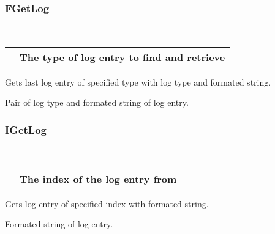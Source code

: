 \documentclass[letterpaper,10pt,english]{sphinxmanual}
\begin{document}
\subsubsection{FGetLog}
\label{\detokenize{log:fgetlog}}

\begin{fulllineitems}
\label{\detokenize{log:_CPPv2N6pessum7FGetLogEi}}%
\pysigstartmultiline
{}%
\pysigstopmultiline~

\begin{savenotes}\sphinxattablestart
\centering
\begin{tabulary}{\linewidth}[t]{|T|T|}
\hline

&
The type of log entry to find and retrieve
\\
\hline
\end{tabulary}
\par
\sphinxattableend\end{savenotes}

Gets last log entry of specified type with log type and formated string.

 Pair of log type and formated string of log entry.

\end{fulllineitems}



\subsubsection{IGetLog}
\label{\detokenize{log:igetlog}}

\begin{fulllineitems}
\label{\detokenize{log:_CPPv2N6pessum7IGetLogEi}}%
\pysigstartmultiline
{}%
\pysigstopmultiline~

\begin{savenotes}\sphinxattablestart
\centering
\begin{tabulary}{\linewidth}[t]{|T|T|}
\hline

&
The index of the log entry from {\hyperref[\detokenize{log:_CPPv2N6pessum11global_logsE}]{}}
\\
\hline
\end{tabulary}
\par
\sphinxattableend\end{savenotes}

Gets log entry of specified index with formated string.

 Formated string of log entry.

\end{fulllineitems}
\end{document}
